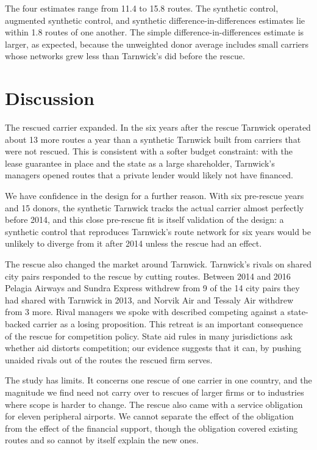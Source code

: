 \documentclass[12pt]{article}
\begin{document}
The four estimates range from 11.4 to 15.8 routes. The synthetic control, augmented synthetic control, and synthetic difference-in-differences estimates lie within 1.8 routes of one another. The simple difference-in-differences estimate is larger, as expected, because the unweighted donor average includes small carriers whose networks grew less than Tarnwick's did before the rescue.

\section{Discussion}

The rescued carrier expanded. In the six years after the rescue Tarnwick operated about 13 more routes a year than a synthetic Tarnwick built from carriers that were not rescued. This is consistent with a softer budget constraint: with the lease guarantee in place and the state as a large shareholder, Tarnwick's managers opened routes that a private lender would likely not have financed.

We have confidence in the design for a further reason. With six pre-rescue years and 15 donors, the synthetic Tarnwick tracks the actual carrier almost perfectly before 2014, and this close pre-rescue fit is itself validation of the design: a synthetic control that reproduces Tarnwick's route network for six years would be unlikely to diverge from it after 2014 unless the rescue had an effect.

The rescue also changed the market around Tarnwick. Tarnwick's rivals on shared city pairs responded to the rescue by cutting routes. Between 2014 and 2016 Pelagia Airways and Sundra Express withdrew from 9 of the 14 city pairs they had shared with Tarnwick in 2013, and Norvik Air and Tessaly Air withdrew from 3 more. Rival managers we spoke with described competing against a state-backed carrier as a losing proposition. This retreat is an important consequence of the rescue for competition policy. State aid rules in many jurisdictions ask whether aid distorts competition; our evidence suggests that it can, by pushing unaided rivals out of the routes the rescued firm serves.

The study has limits. It concerns one rescue of one carrier in one country, and the magnitude we find need not carry over to rescues of larger firms or to industries where scope is harder to change. The rescue also came with a service obligation for eleven peripheral airports. We cannot separate the effect of the obligation from the effect of the financial support, though the obligation covered existing routes and so cannot by itself explain the new ones.
\end{document}
